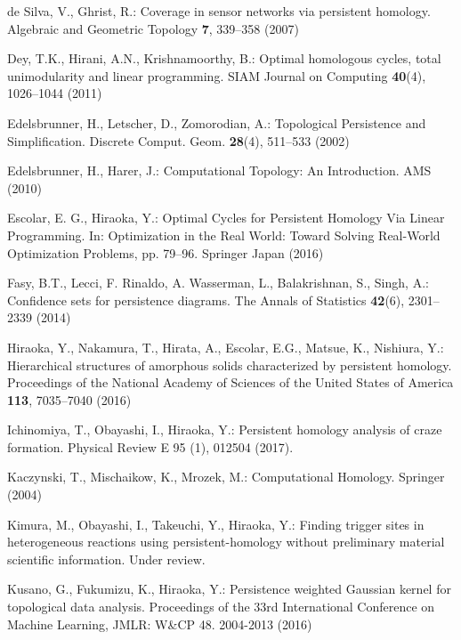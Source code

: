 \documentclass[smallextended]{svjour3}
\begin{document}
\begin{thebibliography}{99}
  de Silva, V., Ghrist, R.:
  Coverage in sensor networks via persistent homology.
  Algebraic and Geometric Topology \textbf{7}, 339--358 (2007)

  Dey, T.K., Hirani, A.N., Krishnamoorthy, B.:
  Optimal homologous cycles, total unimodularity and linear programming.
  SIAM Journal on Computing \textbf{40}(4), 1026--1044 (2011)

  Edelsbrunner, H., Letscher, D., Zomorodian, A.: 
  Topological Persistence and Simplification. 
  Discrete Comput. Geom. \textbf{28}(4), 511--533 (2002)

  Edelsbrunner, H., Harer, J.:
  Computational Topology: An Introduction. 
  AMS (2010)

  Escolar, E. G., Hiraoka, Y.:
  Optimal Cycles for Persistent Homology Via Linear Programming.
  In: Optimization in the Real World: Toward Solving Real-World Optimization Problems,
  pp. 79--96. Springer Japan (2016)
  
  Fasy, B.T., Lecci, F. Rinaldo, A. Wasserman, L., Balakrishnan, S., Singh, A.: Confidence sets for persistence diagrams. The Annals of Statistics \textbf{42}(6), 2301--2339 (2014)

  Hiraoka, Y., Nakamura, T., Hirata, A., Escolar, E.G., Matsue, K., Nishiura, Y.:
  Hierarchical structures of amorphous solids characterized by persistent homology.
  Proceedings of the National
  Academy of Sciences of the United States of America \textbf{113}, 7035--7040 (2016)
  
  Ichinomiya, T., Obayashi, I., Hiraoka, Y.: Persistent homology analysis of craze formation. Physical Review E 95 (1), 012504 (2017).

  Kaczynski, T., Mischaikow, K., Mrozek, M.: Computational Homology. Springer (2004)

  Kimura, M., Obayashi, I., Takeuchi, Y., Hiraoka, Y.:
  Finding trigger sites in heterogeneous reactions using persistent-homology
  without preliminary material scientific information.
  Under review.

  Kusano, G., Fukumizu, K., Hiraoka, Y.: Persistence weighted Gaussian kernel for topological data analysis. Proceedings of the 33rd International Conference on Machine Learning, JMLR: W\&CP 48. 2004-2013 (2016)


\end{thebibliography}
\end{document}
